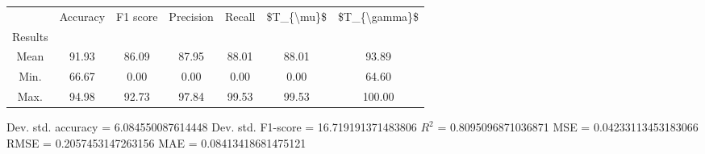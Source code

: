\begin{tabular}{|c|c|c|c|c|c|c|}
\toprule
{} &  Accuracy &  F1 score &  Precision &  Recall &  \$T\_\{\textbackslash mu\}\$ &  \$T\_\{\textbackslash gamma\}\$ \\
Results &           &           &            &         &            &               \\
\hline
Mean    &     91.93 &     86.09 &      87.95 &   88.01 &      88.01 &         93.89 \\
Min.    &     66.67 &      0.00 &       0.00 &    0.00 &       0.00 &         64.60 \\
Max.    &     94.98 &     92.73 &      97.84 &   99.53 &      99.53 &        100.00 \\
\bottomrule
\end{tabular}

 Dev. std. accuracy = 6.084550087614448
 Dev. std. F1-score = 16.719191371483806
 $R^2$ = 0.8095096871036871
 MSE = 0.04233113453183066
 RMSE = 0.2057453147263156
 MAE = 0.08413418681475121